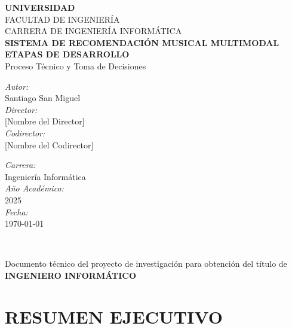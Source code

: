 \documentclass[12pt,a4paper]{report}
\begin{document}
\begin{titlepage}
\begin{center}

\vspace*{1cm}

{\Large \textbf{UNIVERSIDAD}}\\[0.5cm]
{\large FACULTAD DE INGENIERÍA}\\[0.5cm]
{\large CARRERA DE INGENIERÍA INFORMÁTICA}\\[3cm]

{\Large \textbf{SISTEMA DE RECOMENDACIÓN MUSICAL MULTIMODAL}}\\[0.5cm]
{\Large \textbf{ETAPAS DE DESARROLLO}}\\[0.5cm]
{\large Proceso Técnico y Toma de Decisiones}\\[2cm]

\begin{minipage}{0.4\textwidth}
\begin{flushleft} \large
\emph{Autor:}\\
{Santiago San Miguel}\\[0.3cm]
\emph{Director:}\\
{[Nombre del Director]}\\[0.3cm]
\emph{Codirector:}\\
{[Nombre del Codirector]}
\end{flushleft}
\end{minipage}
\begin{minipage}{0.4\textwidth}
\begin{flushright} \large
\emph{Carrera:} \\
Ingeniería Informática\\[0.3cm]
\emph{Año Académico:} \\
2025\\[0.3cm]
\emph{Fecha:} \\
\today
\end{flushright}
\end{minipage}\\[2cm]

\vfill

{\large Documento técnico del proyecto de investigación para obtención del título de}\\[0.5cm]
{\Large \textbf{INGENIERO INFORMÁTICO}}

\end{center}
\end{titlepage}

\chapter*{RESUMEN EJECUTIVO}
\end{document}
